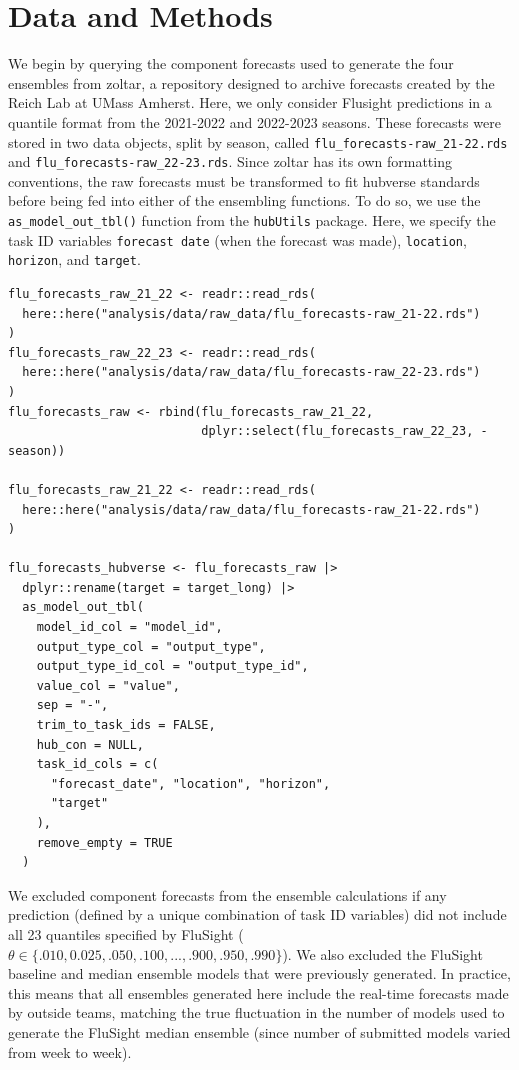 \documentclass[
  article,
  shortnames,
  notitle]{jss}
\begin{document}
\section{Data and Methods}\label{data-and-methods}

We begin by querying the component forecasts used to generate the four
ensembles from zoltar, a repository designed to archive forecasts
created by the Reich Lab at UMass Amherst. Here, we only consider
Flusight predictions in a quantile format from the 2021-2022 and
2022-2023 seasons. These forecasts were stored in two data objects,
split by season, called \texttt{flu\_forecasts-raw\_21-22.rds} and
\texttt{flu\_forecasts-raw\_22-23.rds}. Since zoltar has its own
formatting conventions, the raw forecasts must be transformed to fit
hubverse standards before being fed into either of the ensembling
functions. To do so, we use the \texttt{as\_model\_out\_tbl()} function
from the \texttt{hubUtils} package. Here, we specify the task ID
variables \texttt{forecast\ date} (when the forecast was made),
\texttt{location}, \texttt{horizon}, and \texttt{target}.

\begin{verbatim}
flu_forecasts_raw_21_22 <- readr::read_rds(
  here::here("analysis/data/raw_data/flu_forecasts-raw_21-22.rds")
)
flu_forecasts_raw_22_23 <- readr::read_rds(
  here::here("analysis/data/raw_data/flu_forecasts-raw_22-23.rds")
)
flu_forecasts_raw <- rbind(flu_forecasts_raw_21_22,
                           dplyr::select(flu_forecasts_raw_22_23, -season))

flu_forecasts_raw_21_22 <- readr::read_rds(
  here::here("analysis/data/raw_data/flu_forecasts-raw_21-22.rds")
)

flu_forecasts_hubverse <- flu_forecasts_raw |>
  dplyr::rename(target = target_long) |>
  as_model_out_tbl(
    model_id_col = "model_id",
    output_type_col = "output_type",
    output_type_id_col = "output_type_id",
    value_col = "value",
    sep = "-",
    trim_to_task_ids = FALSE,
    hub_con = NULL,
    task_id_cols = c(
      "forecast_date", "location", "horizon",
      "target"
    ),
    remove_empty = TRUE
  )
\end{verbatim}

We excluded component forecasts from the ensemble calculations if any
prediction (defined by a unique combination of task ID variables) did
not include all 23 quantiles specified by FluSight
(\(\theta \in \{.010, 0.025, .050, .100, ..., .900, .950, .990\}\)). We
also excluded the FluSight baseline and median ensemble models that were
previously generated. In practice, this means that all ensembles
generated here include the real-time forecasts made by outside teams,
matching the true fluctuation in the number of models used to generate
the FluSight median ensemble (since number of submitted models varied
from week to week).
\end{document}

